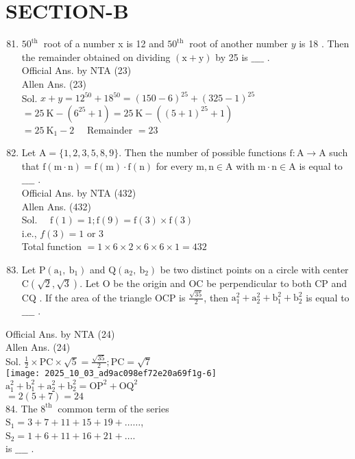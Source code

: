 \documentclass[10pt]{article}
\begin{document}
\section*{SECTION-B}
\begin{enumerate}
  \setcounter{enumi}{80}
  \item \(50^{\text {th }}\) root of a number x is 12 and \(50^{\text {th }}\) root of another number \(y\) is 18 . Then the remainder obtained on dividing \((\mathrm{x}+\mathrm{y})\) by 25 is \(\_\_\_\_\) .\\
Official Ans. by NTA (23)\\
Allen Ans. (23)\\
Sol. \(x+y=12^{50}+18^{50}=(150-6)^{25}+(325-1)^{25}\)\\
\(=25 \mathrm{~K}-\left(6^{25}+1\right)=25 \mathrm{~K}-\left((5+1)^{25}+1\right)\)\\
\(=25 \mathrm{~K}_{1}-2 \quad\) Remainder \(=23\)
  \item Let \(\mathrm{A}=\{1,2,3,5,8,9\}\). Then the number of possible functions \(\mathrm{f}: \mathrm{A} \rightarrow \mathrm{A}\) such that \(\mathrm{f}(\mathrm{m} \cdot \mathrm{n})=\mathrm{f}(\mathrm{m}) \cdot \mathrm{f}(\mathrm{n})\) for every \(\mathrm{m}, \mathrm{n} \in \mathrm{A}\) with \(\mathrm{m} \cdot \mathrm{n} \in \mathrm{A}\) is equal to \(\_\_\_\_\) .\\
Official Ans. by NTA (432)\\
Allen Ans. (432)\\
Sol. \(\quad \mathrm{f}(1)=1 ; \mathrm{f}(9)=\mathrm{f}(3) \times \mathrm{f}(3)\)\\
i.e., \(f(3)=1\) or 3\\
Total function \(=1 \times 6 \times 2 \times 6 \times 6 \times 1=432\)
  \item Let \(\mathrm{P}\left(\mathrm{a}_{1}, \mathrm{~b}_{1}\right)\) and \(\mathrm{Q}\left(\mathrm{a}_{2}, \mathrm{~b}_{2}\right)\) be two distinct points on a circle with center \(\mathrm{C}(\sqrt{2}, \sqrt{3})\). Let O be the origin and OC be perpendicular to both CP and CQ . If the area of the triangle OCP is \(\frac{\sqrt{35}}{2}\), then \(\mathrm{a}_{1}^{2}+\mathrm{a}_{2}^{2}+\mathrm{b}_{1}^{2}+\mathrm{b}_{2}^{2}\) is equal to \(\_\_\_\_\) .
\end{enumerate}

Official Ans. by NTA (24)\\
Allen Ans. (24)\\
Sol. \(\frac{1}{2} \times \mathrm{PC} \times \sqrt{5}=\frac{\sqrt{35}}{2} ; \mathrm{PC}=\sqrt{7}\)\\
\texttt{[image: 2025\_10\_03\_ad9ac098ef72e20a69f1g-6]}\\
\(\mathrm{a}_{1}^{2}+\mathrm{b}_{1}^{2}+\mathrm{a}_{2}^{2}+\mathrm{b}_{2}^{2}=\mathrm{OP}^{2}+\mathrm{OQ}^{2}\)\\
\(=2(5+7)=24\)\\
84. The \(8^{\text {th }}\) common term of the series\\
\(\mathrm{S}_{1}=3+7+11+15+19+\ldots \ldots\),\\
\(\mathrm{S}_{2}=1+6+11+16+21+\ldots\).\\
is \(\_\_\_\_\) .
\end{document}
